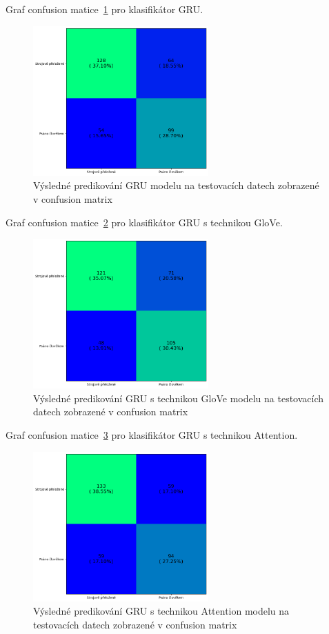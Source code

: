 Graf confusion matice~\ref{fig:EN GRU model conf} pro klasifikátor GRU.\@
\begin{figure}[H]
	\centering
	\includegraphics[width=0.6\textwidth]{Figures/EN_GRU_conf.png}
	\caption{Výsledné predikování GRU modelu na testovacích datech zobrazené v confusion matrix}\label{fig:EN GRU model conf}
\end{figure}

Graf confusion matice~\ref{fig:EN GRU GloVe model conf} pro klasifikátor GRU s technikou GloVe.
\begin{figure}[H]
	\centering
	\includegraphics[width=0.6\textwidth]{Figures/EN_GRU_GLOVE_conf.png}
	\caption{Výsledné predikování GRU s technikou GloVe modelu na testovacích datech zobrazené v confusion matrix}\label{fig:EN GRU GloVe model conf}
\end{figure}

Graf confusion matice~\ref{fig:EN GRU Attention model conf} pro klasifikátor GRU s technikou Attention.
\begin{figure}[H]
	\centering
	\includegraphics[width=0.6\textwidth]{Figures/EN_GRU_Attention_conf.png}
	\caption{Výsledné predikování GRU s technikou Attention modelu na testovacích datech zobrazené v confusion matrix}\label{fig:EN GRU Attention model conf}
\end{figure}

